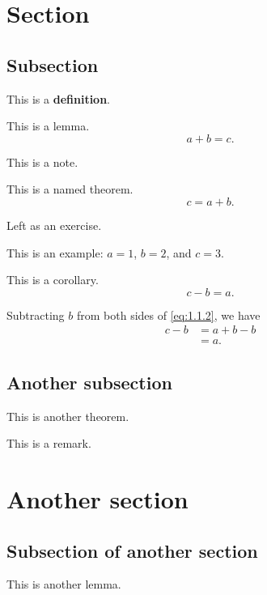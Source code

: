 \documentclass{notes}
\begin{document}
\section{Section}

\subsection{Subsection}

\begin{defn}
  This is a \textbf{definition}.
\end{defn}

\begin{lem}
  This is a lemma.
  \begin{equation}
    a + b = c.
  \end{equation}
\end{lem}

\begin{note}
  This is a note.
\end{note}

\begin{thm}[Theorem]
  This is a named theorem.
  \begin{equation} \label{eq:1.1.2}
    c = a + b.
  \end{equation}
\end{thm}

\begin{prf}
  Left as an exercise.
\end{prf}

\begin{eg}
  This is an example: $a = 1$, $b = 2$, and $c = 3$.
\end{eg}

\begin{cor}
  This is a corollary.
  \begin{equation}
    c - b = a.
  \end{equation}
\end{cor}

\begin{prf}
  Subtracting $b$ from both sides of \eqref{eq:1.1.2}, we have
  \begin{align}
    c - b &= a + b - b \nonumber \\ 
    &= a.
  \end{align}
\end{prf}

\subsection{Another subsection}

\begin{thm}[Another]
  This is another theorem.
\end{thm}

\begin{rmk}
  This is a remark.
\end{rmk}

\section{Another section}

\subsection{Subsection of another section}

\begin{lem}
  This is another lemma.
\end{lem}
\end{document}
